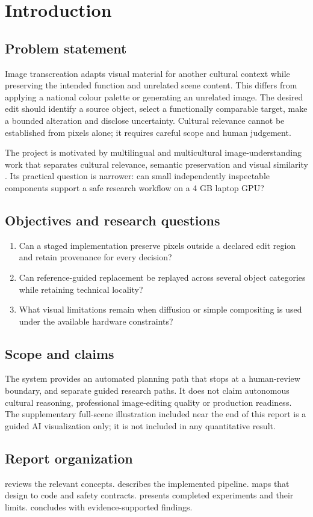 \chapter{Introduction}
\label{ch:introduction}
\section{Problem statement}
Image transcreation adapts visual material for another cultural context while preserving the intended function and unrelated scene content. This differs from applying a national colour palette or generating an unrelated image. The desired edit should identify a source object, select a functionally comparable target, make a bounded alteration and disclose uncertainty. Cultural relevance cannot be established from pixels alone; it requires careful scope and human judgement.

The project is motivated by multilingual and multicultural image-understanding work that separates cultural relevance, semantic preservation and visual similarity \cite{khanuja2024image,khanuja2025evaluating}. Its practical question is narrower: can small independently inspectable components support a safe research workflow on a 4 GB laptop GPU?

\section{Objectives and research questions}
\begin{enumerate}[label=\textbf{RQ\arabic*:},leftmargin=*]
\item Can a staged implementation preserve pixels outside a declared edit region and retain provenance for every decision?
\item Can reference-guided replacement be replayed across several object categories while retaining technical locality?
\item What visual limitations remain when diffusion or simple compositing is used under the available hardware constraints?
\end{enumerate}

\section{Scope and claims}
The system provides an automated planning path that stops at a human-review boundary, and separate guided research paths. It does not claim autonomous cultural reasoning, professional image-editing quality or production readiness. The supplementary full-scene illustration included near the end of this report is a guided AI visualization only; it is not included in any quantitative result.

\section{Report organization}
 reviews the relevant concepts.  describes the implemented pipeline.  maps that design to code and safety contracts.  presents completed experiments and their limits.  concludes with evidence-supported findings.

